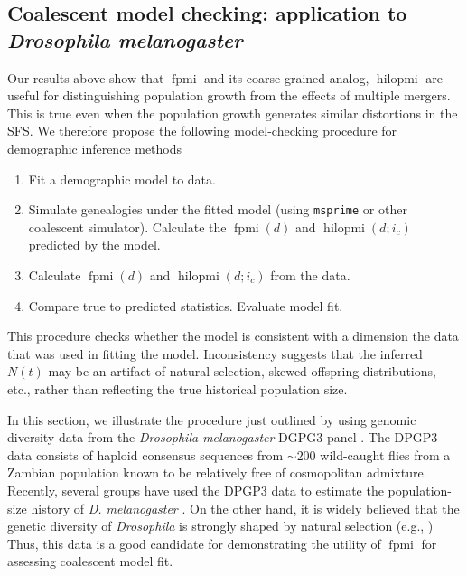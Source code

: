 \documentclass[11pt, letterpaper]{article}   	%
\DeclareMathOperator{\fpmi}{fpmi}
\DeclareMathOperator{\hilopmi}{hilopmi}
\begin{document}
\subsection*{Coalescent model checking: application to \textit{Drosophila melanogaster}}

Our results above show that $\fpmi$ and its coarse-grained analog, $\hilopmi$ are useful for distinguishing population growth from the effects of multiple mergers.
This is true even when the population growth generates similar distortions in the SFS.
We therefore propose the following model-checking procedure for demographic inference methods
\begin{enumerate}[label=(\roman*), before=\unskip{: }]
    \item Fit a demographic model to data.
    \item Simulate genealogies under the fitted model (using \texttt{msprime} or other coalescent simulator). Calculate the $\fpmi(d)$ and $\hilopmi(d;i_c)$ predicted by the model.
    \item Calculate $\fpmi(d)$ and $\hilopmi(d;i_c)$ from the data.
    \item Compare true to predicted statistics. Evaluate model fit.
\end{enumerate}
This procedure checks whether the model is consistent with a dimension the data that was used in fitting the model.
Inconsistency suggests that the inferred $N(t)$ may be an artifact of natural selection, skewed offspring distributions, etc., rather than reflecting the true historical population size.

In this section, we illustrate the procedure just outlined by using genomic diversity data from the \textit{Drosophila melanogaster} DGPG3 panel \cite{LackEtAl2015}.
The DPGP3 data consists of haploid consensus sequences from $\sim 200$ wild-caught flies from a Zambian population known to be relatively free of cosmopolitan admixture.
Recently, several groups have used the DPGP3 data to estimate the population-size history of \textit{D. melanogaster} \autocite{TerhorstEtAl2017,RagsdaleGutenkunst2017}.
On the other hand, it is widely believed that the genetic diversity of \textit{Drosophila} is strongly shaped by natural selection (e.g., \cite{Elyashiv??201?, GarudPetrov2016, others?})
Thus, this data is a good candidate for demonstrating the utility of $\fpmi$ for assessing coalescent model fit.
\end{document}
